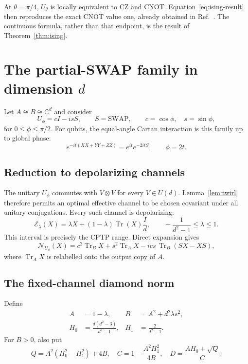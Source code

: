 \documentclass[11pt,a4paper]{article}
\theoremstyle{remark}
\newcommand{\Tr}{\operatorname{Tr}}
\newcommand{\cE}{\mathcal{E}}
\newcommand{\cN}{\mathcal{N}}
\newcommand{\SWAP}{\mathrm{SWAP}}
\begin{document}
At $\theta=\pi/4$, $U_\theta$ is locally equivalent to CZ and CNOT.
Equation~\eqref{eq:ising-result} then reproduces the exact CNOT value one,
already obtained in Ref.~\cite{barsse2025}.  The continuous formula, rather
than that endpoint, is the result of Theorem~\ref{thm:ising}.

\section{The partial-SWAP family in dimension \texorpdfstring{$d$}{d}}

Let $A\cong B\cong\mathbb{C}^d$ and consider
\begin{equation}
 U_\phi=cI-isS,\qquad S=\SWAP,\qquad c=\cos\phi,\quad s=\sin\phi,
 \label{eq:partial-swap}
\end{equation}
for $0\leq\phi\leq\pi/2$.  For qubits, the equal-angle Cartan interaction is
this family up to global phase:
\[
 e^{-it(XX+YY+ZZ)}=e^{it}e^{-2itS},\qquad \phi=2t.
\]

\subsection{Reduction to depolarizing channels}

The unitary $U_\phi$ commutes with $V\otimes V$ for every $V\in U(d)$.
Lemma~\ref{lem:twirl} therefore permits an optimal effective channel to be
chosen covariant under all unitary conjugations.  Every such channel is
depolarizing:
\begin{equation}
 \cE_\lambda(X)
 =\lambda X+(1-\lambda)\Tr(X)\frac{I}{d},
 \qquad -\frac{1}{d^2-1}\leq\lambda\leq1.
 \label{eq:depol}
\end{equation}
This interval is precisely the CPTP range.  Direct expansion gives
\[
 \cN_{U_\phi}(X)
 =c^2\Tr_BX+s^2\Tr_AX-ics\,\Tr_B(SX-XS),
\]
where $\Tr_A X$ is relabelled onto the output copy of $A$.

\subsection{The fixed-channel diamond norm}

Define
\begin{align}
 A&=1-\lambda,&
 B&=A^2+d^2\lambda s^2,\nonumber\\
 H_0&=\frac{d(d^2-3)}{d^2-1},&
 H_1&=\frac{2}{d^2-1}.
 \label{eq:general-terms}
\end{align}
For $B>0$, also put
\begin{equation}
 Q=A^2(H_0^2-H_1^2)+4B,\quad
 C=1-\frac{A^2H_1^2}{4B},\quad
 D=\frac{AH_0+\sqrt Q}{C}.
 \label{eq:general-D}
\end{equation}
\end{document}
